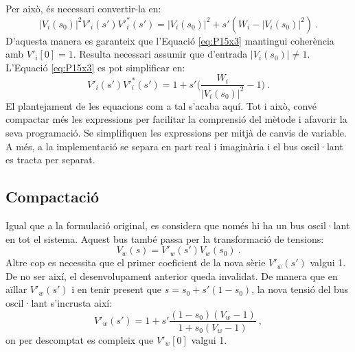 Per això, és necessari convertir-la en:
\begin{equation}
    |V_i(s_0)|^2V'_i(s')V'^{*}_i(s')=|V_i(s_0)|^2+s'(W_i-|V_i(s_0)|^2)\ .
            \label{eq:P15x3}
    \end{equation}
D'aquesta manera es garanteix que l'Equació \ref{eq:P15x3} mantingui coherència amb $V'_i[0]=1$. Resulta necessari assumir que d'entrada $|V_i(s_0)| \neq 1$. L'Equació \ref{eq:P15x3} es pot simplificar en:
\begin{equation}
    V'_i(s')V'^{*}_i(s')=1+s'\biggl(\frac{W_i}{|V_i(s_0)|^2}-1\biggr)\ .
            \label{eq:P15x4}
    \end{equation}
El plantejament de les equacions com a tal s'acaba aquí. Tot i això, convé compactar més les expressions per facilitar la comprensió del mètode i afavorir la seva programació. Se simplifiquen les expressions per mitjà de canvis de variable. A més, a la implementació se separa en part real i imaginària i el bus oscil·lant es tracta per separat. 

\subsection{Compactació}
Igual que a la formulació original, es considera que només hi ha un bus oscil·lant en tot el sistema. Aquest bus també passa per la transformació de tensions:
\begin{equation}
    V_w(s)=V'_w(s')V_w(s_0)\ .
    \label{eq:C1}
\end{equation}
Altre cop es necessita que el primer coeficient de la nova sèrie $V'_w(s')$ valgui 1. De no ser així, el desenvolupament anterior queda invalidat. De manera que en aïllar $V'_w(s')$ i en tenir present que $s=s_0+s'(1-s_0)$, la nova tensió del bus oscil·lant s'incrusta així:
\begin{equation}
    V'_w(s')=1+s'\frac{(1-s_0)(V_w-1)}{1+s_0(V_w-1)}\ ,
    \label{eq:C2}
\end{equation}
on per descomptat es compleix que $V'_w[0]$ valgui 1. 

